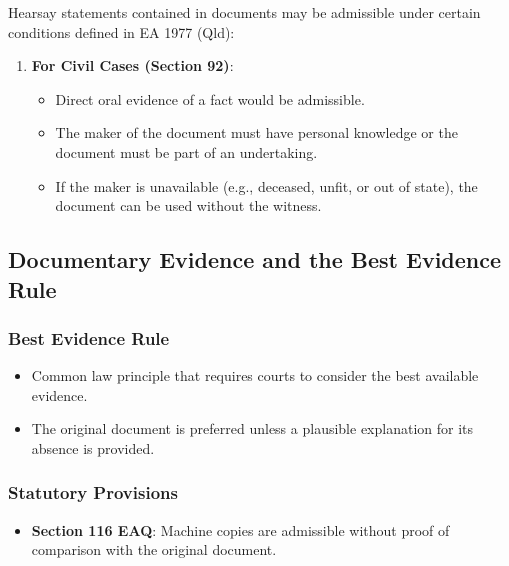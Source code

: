 Hearsay statements contained in documents may be admissible under
certain conditions defined in EA 1977 (Qld):

\begin{enumerate}
\def\labelenumi{\arabic{enumi}.}
\tightlist
\item
  \textbf{For Civil Cases (Section 92)}:

  \begin{itemize}
  \tightlist
  \item
    Direct oral evidence of a fact would be admissible.
  \item
    The maker of the document must have personal knowledge or the
    document must be part of an undertaking.
  \item
    If the maker is unavailable (e.g., deceased, unfit, or out of
    state), the document can be used without the witness.
  \end{itemize}
\end{enumerate}

\subsection{  Documentary Evidence and the Best Evidence
Rule}\label{documentary-evidence-and-the-best-evidence-rule}

\subsubsection{Best Evidence Rule}\label{best-evidence-rule}

\begin{itemize}
\tightlist
\item
  Common law principle that requires courts to consider the best
  available evidence.
\item
  The original document is preferred unless a plausible explanation for
  its absence is provided.
\end{itemize}

\subsubsection{Statutory Provisions}\label{statutory-provisions}

\begin{itemize}
\tightlist
\item
  \textbf{Section 116 EAQ}: Machine copies are admissible without proof
  of comparison with the original document.
\end{itemize}


